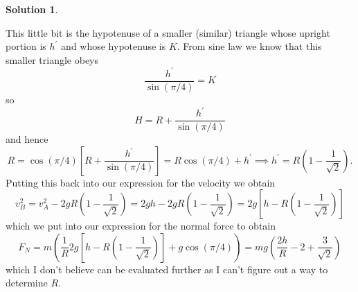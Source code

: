 \documentclass[10pt]{article}
\theoremstyle{definition}
\newtheorem{soln}{Solution}
\newcommand{\pr}[1]{{#1}^\prime}
\begin{document}
\begin{soln}
\begin{enumerate}[label=(\alph*)]
          This little bit is the hypotenuse of a smaller (similar) triangle whose upright portion is $\pr{h}$ and whose hypotenuse is $K$. From sine law we know that
          this smaller triangle obeys $$\frac{\pr{h}}{\sin(\pi/4)}=K$$ so
          $$H=R+\frac{\pr{h}}{\sin(\pi/4)}$$ and hence
          $$R=\cos(\pi/4)\left[R+\frac{\pr{h}}{\sin(\pi/4)}\right]=R\cos(\pi/4)+\pr{h}\implies \pr{h}=R\left(1-\frac{1}{\sqrt{2}}\right).$$
          Putting this back into our expression for the velocity we obtain
          $$v_B^2=v_A^2-2gR\left(1-\frac{1}{\sqrt{2}}\right)=2gh-2gR\left(1-\frac{1}{\sqrt{2}}\right)=2g\left[h-R\left(1-\frac{1}{\sqrt{2}}\right)\right]$$
          which we put into our expression for the normal force to obtain
          $$F_N=m\left(\frac{1}{R}2g\left[h-R\left(1-\frac{1}{\sqrt{2}}\right)\right]+g\cos(\pi/4)\right)=mg\left(\frac{2h}{R}-2+\frac{3}{\sqrt{2}}\right)$$
          which I don't believe can be evaluated further as I can't figure out a way to determine $R$.
  \end{enumerate}
\end{soln}
\end{document}
